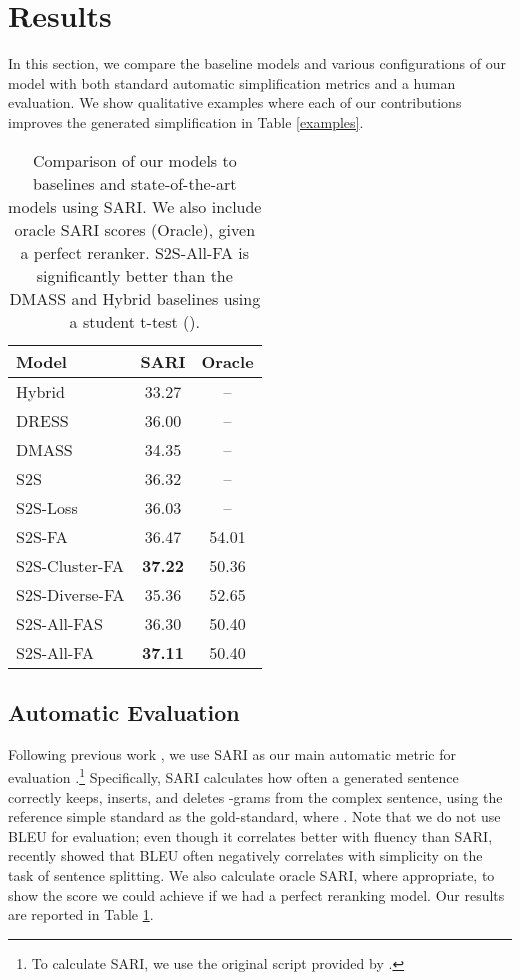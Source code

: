 \documentclass[11pt,a4paper]{article}
\begin{document}
\section{Results} \label{results}

In this section, we compare the baseline models and various configurations of our model with both standard automatic simplification metrics and a human evaluation. We show qualitative examples where each of our contributions improves the generated simplification in Table \ref{examples}.

\begin{table}
\begin{center}
\begin{tabular}{|l|c|c|} \hline
\textbf{Model} & \textbf{SARI} & \textbf{Oracle} \\ \hline
Hybrid & 33.27 & -- \\
DRESS & 36.00 & -- \\
DMASS & 34.35 & -- \\ \hline
S2S & 36.32 & -- \\
S2S-Loss & 36.03 & -- \\
S2S-FA & 36.47 & 54.01 \\
S2S-Cluster-FA & \textbf{37.22} &  50.36 \\
S2S-Diverse-FA & 35.36 & 52.65 \\
S2S-All-FAS & 36.30 & 50.40 \\
S2S-All-FA & \textbf{37.11} & 50.40 \\ \hline
\end{tabular}
\end{center}
\caption{\label{sari} Comparison of our models to baselines and state-of-the-art models using SARI. We also include oracle SARI scores (Oracle), given a perfect reranker. S2S-All-FA is significantly better than the DMASS and Hybrid baselines using a student t-test ().}
\end{table}

\subsection{Automatic Evaluation}

Following previous work \cite{zhang2017sentence,zhao2018integrating}, we use SARI as our main automatic metric for evaluation \cite{xu2016optimizing}.\footnote{To calculate SARI, we use the original script provided by \cite{xu2016optimizing}.} Specifically, SARI calculates how often a generated sentence correctly keeps, inserts, and deletes -grams from the complex sentence, using the reference simple standard as the gold-standard, where . Note that we do not use BLEU \cite{papineni2002bleu} for evaluation; even though it correlates better with fluency than SARI,  recently showed that BLEU often negatively correlates with simplicity on the task of sentence splitting. We also calculate oracle SARI, where appropriate, to show the score we could achieve if we had a perfect reranking model. Our results are reported in Table \ref{sari}.
\end{document}

